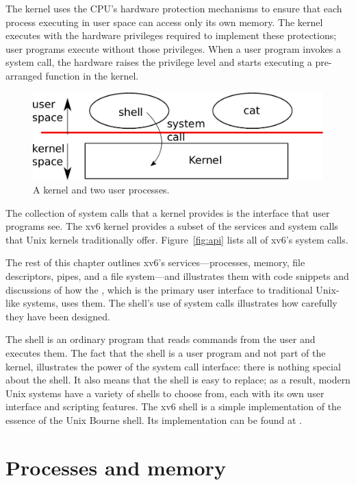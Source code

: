The kernel uses the CPU's hardware protection mechanisms to
ensure that each process executing in user space can access only
its own memory.
The kernel executes with the hardware privileges required to
implement these protections; user programs execute without
those privileges.
When a user program invokes a system call, the hardware
raises the privilege level and starts executing a pre-arranged
function in the kernel.

\begin{figure}[t]
\center
\includegraphics[scale=0.5]{fig/os.pdf}
\caption{A kernel and two user processes.}
\label{fig:os}
\end{figure}

The collection of system calls that a kernel provides
is the interface that user programs see.
The xv6 kernel provides a subset of the services and system calls
that Unix kernels traditionally offer.  
Figure~\ref{fig:api} 
lists all of xv6's system calls.

The rest of this chapter outlines xv6's services---processes, memory,
file descriptors, pipes, and a file system---and illustrates them with
code snippets and discussions of how the , which is
the primary user interface to traditional Unix-like systems, uses
them. The shell's use of system calls illustrates how carefully they
have been designed.

The shell is an ordinary program that reads commands from the user
and executes them.
The fact that the shell is a user program and not part of the kernel,
illustrates the power of the system call interface: there is nothing
special about the shell.
It also means that the shell is easy to replace; as a result,
modern Unix systems have a variety of
shells to choose from, each with its own user interface
and scripting features.
The xv6 shell is a simple implementation of the essence of
the Unix Bourne shell.  Its implementation can be found at 
.
\section{Processes and memory}

